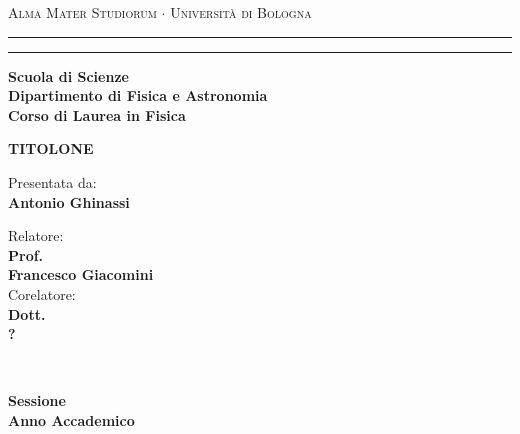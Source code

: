 \documentclass[../main.tex]{subfiles}
\begin{document}
\begin{titlepage}
    \begin{center}
        {{\Large{\textsc{Alma Mater Studiorum $\cdot$ Università di
                            Bologna}}}} \rule[0.1cm]{15.8cm}{0.1mm}
        \rule[0.5cm]{15.8cm}{0.6mm}
        {\small{\bf         Scuola di Scienze \\
                Dipartimento di Fisica e Astronomia\\
                Corso di Laurea in Fisica }}
    \end{center}
    \vspace{15mm}
    \begin{center}
        \vspace{3cm}
        \Large
        {\textbf{TITOLONE}}
        \vspace{1cm}
    \end{center}
    \vspace{40mm}
    \par
    \noindent

    \vspace{1 cm}
    \begin{minipage}[t]{0.34\textwidth}
        \begin{flushleft}
            {Presentata da: \\ \textbf{Antonio Ghinassi}}
        \end{flushleft}
    \end{minipage}
    \begin{minipage}[t]{0.64\textwidth}
        \begin{flushright}
            Relatore: \\
            \textbf{Prof.} \\
            \textbf{Francesco Giacomini} \\
            \vspace{0.5 cm}
            Corelatore: \\
            \textbf{Dott.}
            \\ \textbf{?}
        \end{flushright}
    \end{minipage}\\

    \vspace{20mm}
    \begin{center}
        {\large{\bf Sessione\\%
                Anno Accademico }}%
    \end{center}
\end{titlepage}
\end{document}
